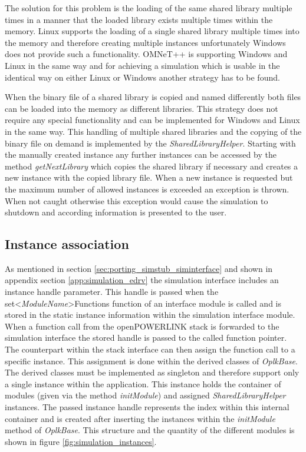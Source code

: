 The solution for this problem is the loading of the same shared library multiple times in a manner that the loaded library exists multiple times within the memory.
Linux supports the loading of a single shared library multiple times into the memory and therefore creating multiple instances unfortunately Windows does not provide such a functionality.
OMNeT++ is supporting Windows and Linux in the same way and for achieving a simulation which is usable in the identical way on either Linux or Windows another strategy has to be found.

When the binary file of a shared library is copied and named differently both files can be loaded into the memory as different libraries.
This strategy does not require any special functionality and can be implemented for Windows and Linux in the same way.
This handling of multiple shared libraries and the copying of the binary file on demand is implemented by the \emph{SharedLibraryHelper}.
Starting with the manually created instance any further instances can be accessed by the method \emph{getNextLibrary} which copies the shared library if necessary and creates a new instance with the copied library file.
When a new instance is requested but the maximum number of allowed instances is exceeded an exception is thrown.
When not caught otherwise this exception would cause the simulation to shutdown and according information is presented to the user. %


\subsection{Instance association}
\label{sec:porting_stack_instance_assoc}
As mentioned in section \ref{sec:porting_simstub_siminterface} and shown in appendix section \ref{app:simulation_edrv} the simulation interface includes an instance handle parameter.
This handle is passed when the set<\emph{ModuleName}>Functions function of an interface module is called and is stored in the static instance information within the simulation interface module.
When a function call from the openPOWERLINK stack is forwarded to the simulation interface the stored handle is passed to the called function pointer.
The counterpart within the stack interface can then assign the function call to a specific instance.
This assignment is done within the derived classes of \emph{OplkBase}.
The derived classes must be implemented as singleton and therefore support only a single instance within the application.
This instance holds the container of modules (given via the method \emph{initModule}) and assigned \emph{SharedLibraryHelper} instances.
The passed instance handle represents the index within this internal container and is created after inserting the instances within the \emph{initModule} method of \emph{OplkBase}.
This structure and the quantity of the different modules is shown in figure \ref{fig:simulation_instances}.

